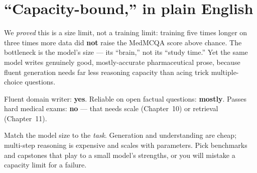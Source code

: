 
\section{``Capacity-bound,'' in plain English}
We \emph{proved} this is a size limit, not a training limit: training five times longer on three times more
data did \textbf{not} raise the MedMCQA score above chance. The bottleneck is the model's size --- its
``brain,'' not its ``study time.'' Yet the same model writes genuinely good, mostly-accurate pharmaceutical
prose, because fluent generation needs far less reasoning capacity than acing trick multiple-choice questions.

\begin{numbers}
Fluent domain writer: \textbf{yes}. Reliable on open factual questions: \textbf{mostly}. Passes hard medical
exams: \textbf{no} --- that needs scale (Chapter~10) or retrieval (Chapter~11).
\end{numbers}

\begin{lesson}
Match the model size to the \emph{task}. Generation and understanding are cheap; multi-step reasoning is
expensive and scales with parameters. Pick benchmarks and capstones that play to a small model's strengths, or
you will mistake a capacity limit for a failure.
\end{lesson}
